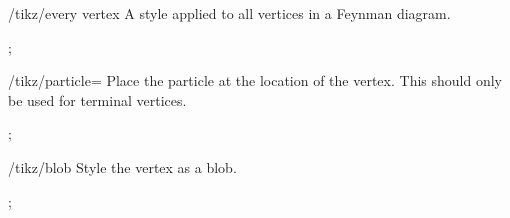 \documentclass[a4paper,final]{ltxdoc}
\begin{document}
\begin{key}{/tikz/every vertex}
  A style applied to all vertices in a Feynman diagram.

\begin{codeexample}[]
\tikz {};
\end{codeexample}
\end{key}

\begin{key}{/tikz/particle=}
  Place the particle  at the location of the vertex.  This should
  only be used for terminal vertices.

\begin{codeexample}[]
\tikz {};
\end{codeexample}
\end{key}

\begin{key}{/tikz/blob}
  Style the vertex as a blob.

\begin{codeexample}[]
\tikz {};
\end{codeexample}
\end{key}

\printindex
\end{document}
